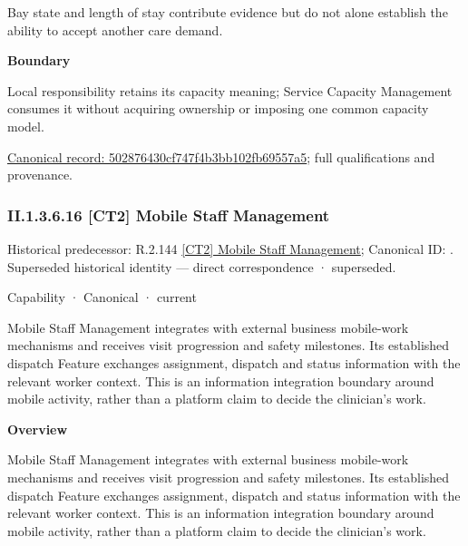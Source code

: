 Bay state and length of stay contribute evidence but do not alone establish the ability to accept another care demand.



\textbf{Boundary}



Local responsibility retains its capacity meaning; Service Capacity Management consumes it without acquiring ownership or imposing one common capacity model.


{\footnotesize \href{../../../../continuum/strategy/capability/feature/502876430cf747f4b3bb102fb69557a5.md}{Canonical record: 502876430cf747f4b3bb102fb69557a5}; full qualifications and provenance.}\par
\subsubsection*{II.1.3.6.16 [CT2] Mobile Staff Management}
\label{navigation:II.1.3.6.16}

{\small Historical predecessor: R.2.144 \hyperref[element:32118856636f400a95fc28daacea61c8]{[CT2] Mobile Staff Management}; Canonical ID: \texttt{}. Superseded historical identity — direct correspondence · superseded.}\par
\label{element:79a4a48fddf74c69acf7e16404d06ea5}
{\small Capability · Canonical · current}\par

Mobile Staff Management integrates with external business mobile-work mechanisms and receives visit progression and safety milestones. Its established dispatch Feature exchanges assignment, dispatch and status information with the relevant worker context. This is an information integration boundary around mobile activity, rather than a platform claim to decide the clinician's work.



\textbf{Overview}



Mobile Staff Management integrates with external business mobile-work mechanisms and receives visit progression and safety milestones. Its established dispatch Feature exchanges assignment, dispatch and status information with the relevant worker context. This is an information integration boundary around mobile activity, rather than a platform claim to decide the clinician's work.



